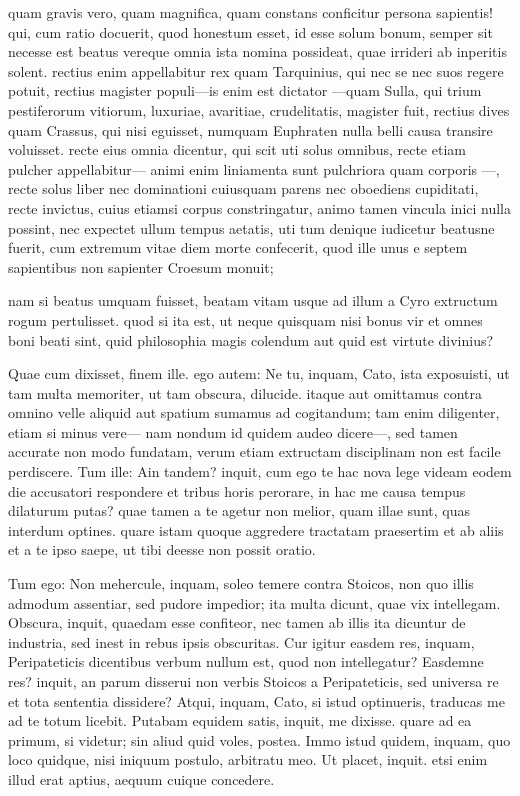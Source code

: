  quam gravis vero, quam magnifica, quam constans conficitur persona sapientis! qui, cum ratio docuerit, quod honestum esset, id esse solum bonum, semper sit necesse est beatus vereque omnia ista nomina possideat, quae irrideri ab inperitis solent. rectius enim appellabitur rex quam Tarquinius, qui nec se nec suos regere potuit, rectius magister populi—is enim est dictator —quam Sulla, qui trium pestiferorum vitiorum, luxuriae, avaritiae, crudelitatis, magister fuit, rectius dives quam Crassus, qui nisi eguisset, numquam Euphraten nulla belli causa transire voluisset. recte eius omnia dicentur, qui scit uti solus omnibus, recte etiam pulcher appellabitur— animi enim liniamenta sunt pulchriora quam corporis —, recte solus liber nec dominationi cuiusquam parens nec oboediens cupiditati, recte invictus, cuius etiamsi corpus constringatur, animo tamen vincula inici nulla possint, nec expectet ullum tempus aetatis, uti tum denique iudicetur beatusne fuerit, cum extremum vitae diem morte confecerit, quod ille unus e septem sapientibus non sapienter Croesum monuit;

 nam si beatus umquam fuisset, beatam vitam usque ad illum a Cyro extructum rogum pertulisset. quod si ita est, ut neque quisquam nisi bonus vir et omnes boni beati sint, quid philosophia magis colendum aut quid est virtute divinius?

 Quae cum dixisset, finem ille. ego autem: Ne tu, inquam, Cato, ista exposuisti, ut tam multa memoriter, ut tam obscura, dilucide. itaque aut omittamus contra omnino velle aliquid aut spatium sumamus ad cogitandum; tam enim diligenter, etiam si minus vere— nam nondum id quidem audeo dicere—, sed tamen accurate non modo fundatam, verum etiam extructam disciplinam non est facile perdiscere. Tum ille: Ain tandem? inquit, cum ego te hac nova lege videam eodem die accusatori respondere et tribus horis perorare, in hac me causa tempus dilaturum putas? quae tamen a te agetur non melior, quam illae sunt, quas interdum optines. quare istam quoque aggredere tractatam praesertim et ab aliis et a te ipso saepe, ut tibi deesse non possit oratio.

 Tum ego: Non mehercule, inquam, soleo temere contra Stoicos, non quo illis admodum assentiar, sed pudore impedior; ita multa dicunt, quae vix intellegam. Obscura, inquit, quaedam esse confiteor, nec tamen ab illis ita dicuntur de industria, sed inest in rebus ipsis obscuritas. Cur igitur easdem res, inquam, Peripateticis dicentibus verbum nullum est, quod non intellegatur? Easdemne res? inquit, an parum disserui non verbis Stoicos a Peripateticis, sed universa re et tota sententia dissidere? Atqui, inquam, Cato, si istud optinueris, traducas me ad te totum licebit. Putabam equidem satis, inquit, me dixisse. quare ad ea primum, si videtur; sin aliud quid voles, postea. Immo istud quidem, inquam, quo loco quidque, nisi iniquum postulo, arbitratu meo. Ut placet, inquit. etsi enim illud erat aptius, aequum cuique concedere.


